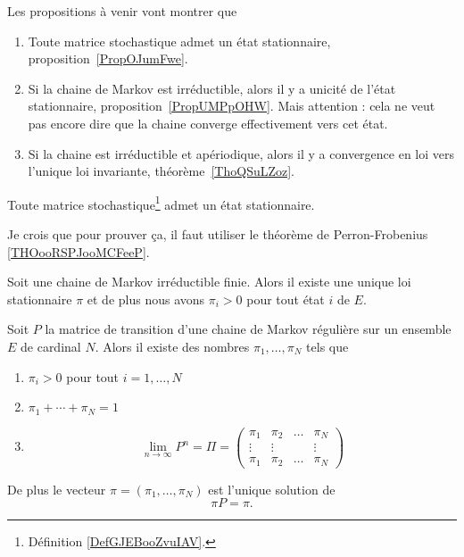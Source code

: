 Les propositions à venir vont montrer que
\begin{enumerate}
	\item
	      Toute matrice stochastique admet un état stationnaire, proposition~\ref{PropOJumFwe}.
	\item
	      Si la chaine de Markov est irréductible, alors il y a unicité de l'état stationnaire, proposition~\ref{PropUMPpOHW}. Mais attention : cela ne veut pas encore dire que la chaine converge effectivement vers cet état.
	\item
	      Si la chaine est irréductible et apériodique, alors il y a convergence en loi vers l'unique loi invariante, théorème~\ref{ThoQSuLZoz}.
\end{enumerate}

\begin{proposition} \label{PropOJumFwe}
    Toute matrice stochastique\footnote{Définition \ref{DefGJEBooZvuIAV}.} admet un état stationnaire.
\end{proposition}
Je crois que pour prouver ça, il faut utiliser le théorème de Perron-Frobenius \ref{THOooRSPJooMCFeeP}.

\begin{proposition}     \label{PropUMPpOHW}
	Soit une chaine de Markov irréductible finie. Alors il existe une unique loi stationnaire \( \pi\) et de plus nous avons \( \pi_i>0\) pour tout état \( i\) de \( E\).
\end{proposition}


\begin{theorem}
	Soit \( P\) la matrice de transition d'une chaine de Markov régulière sur un ensemble \( E\) de cardinal \( N\). Alors il existe des nombres \( \pi_1,\ldots, \pi_N\) tels que
	\begin{enumerate}
		\item
		      \( \pi_i>0\) pour tout \( i=1,\ldots, N\)
		\item
		      \( \pi_1+\cdots +\pi_N=1\)
		\item
		      \begin{equation}
			      \lim_{n\to \infty} P^n=\Pi=\begin{pmatrix}
				      \pi_1  & \pi_2  & \ldots & \pi_N  \\
				      \vdots & \vdots &        & \vdots \\
				      \pi_1  & \pi_2  & \ldots & \pi_N
			      \end{pmatrix}
		      \end{equation}
	\end{enumerate}
	De plus le vecteur \( \pi=(\pi_1,\ldots, \pi_N)\) est l'unique solution de
	\begin{equation}
		\pi P=\pi.
	\end{equation}
\end{theorem}

